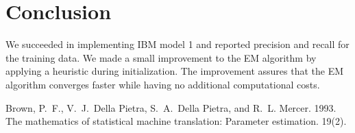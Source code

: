 \documentclass[11pt]{article}
\begin{document}
\section{Conclusion}
We succeeded in implementing IBM model 1 and reported precision and recall for the training data. We made a small improvement to the EM algorithm by applying a heuristic during initialization. The improvement assures that the EM algorithm converges faster while having no additional computational costs.
\begin{thebibliography}{}

Brown, P.~F., V.~J.~Della Pietra, S.~A.~Della Pietra, and R.~L. Mercer. 1993.
\newblock The mathematics of statistical machine translation: Parameter
  estimation.
 19(2).


\end{thebibliography}
\end{document}
